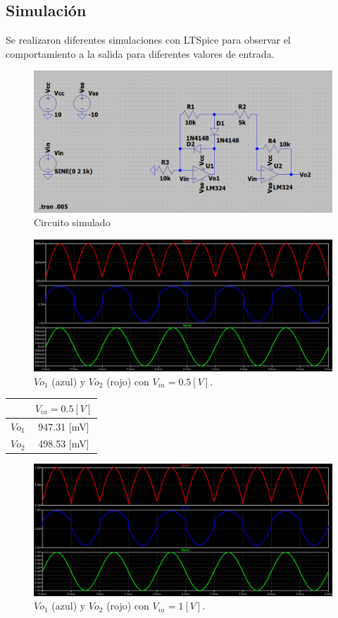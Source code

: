 \subsection{Simulación}
Se realizaron diferentes simulaciones con LTSpice para observar el comportamiento a la salida para diferentes valores de entrada.
\begin{figure}[H]
	\centering
	\includegraphics[width=1\textwidth]{figuras/Circuito3.png}
	\caption{Circuito simulado}
\end{figure}
\begin{figure}[H]
	\centering
	\includegraphics[width=1\textwidth]{figuras/Vo1_Vo2_Vin=0.5.png}
	\caption{$Vo_1$ (azul) y $Vo_2$ (rojo) con $V_{in}=0.5[V]$.}
\end{figure}
\begin{center}
	\begin{tabular}{| c | c |}
		\hline
				& $V_{in}= 0.5[V]$ \\ \hline
		$Vo_1$ 	&  	947.31 [mV]	 \\
		$Vo_2$ 	& 	498.53 [mV]	 \\ \hline
	\end{tabular}
\end{center}
\begin{figure}[H]
	\centering
	\includegraphics[width=1\textwidth]{figuras/Vo1_Vo2_Vin=1.png}
	\caption{$Vo_1$ (azul) y $Vo_2$ (rojo) con $V_{in}=1[V]$.}
\end{figure}
